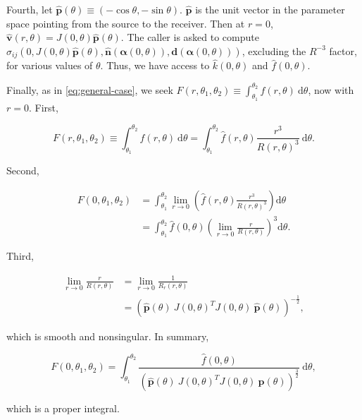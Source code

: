 \documentclass[11pt]{article}
\renewcommand{\vec}[1]{\boldsymbol{#1}}
\newcommand{\uvec}[1]{\hat{\boldsymbol{#1}}}
\begin{document}
Fourth, let $\uvec{p}(\theta) \equiv (-\cos \theta, -\sin \theta)$.
$\uvec{p}$ is the unit vector in the parameter space pointing from the source to the receiver.
Then at $r=0$, $\uvec{v}(r,\theta) = J(0,\theta) \uvec{p}(\theta)$.
The caller is asked to compute
$\sigma_{ij}(0, J(0,\theta) \uvec{p}(\theta), \uvec{n}(\vec{\alpha}(0,\theta)), \vec{d}(\vec{\alpha}(0,\theta)))$,
excluding the $R^{-3}$ factor, for various values of $\theta$.
Thus, we have access to $\hat{k}(0,\theta)$ and $\hat{f}(0,\theta)$.

Finally, as in \eqref{eq:general-case},
we seek $F(r,\theta_1,\theta_2) \equiv \int_{\theta_1}^{\theta_2} f(r,\theta) \ \mathrm{d} \theta$,
now with $r=0$.
First,
\begin{linenomath}\begin{equation*}
  F(r,\theta_1,\theta_2) \equiv \int_{\theta_1}^{\theta_2} f(r,\theta) \ \mathrm{d} \theta
  = \int_{\theta_1}^{\theta_2} \hat{f}(r,\theta) \frac{r^3}{R(r,\theta)^3} \ \mathrm{d} \theta.
\end{equation*}\end{linenomath}
Second,
\begin{linenomath}\begin{align*}
  F(0,\theta_1,\theta_2)
  &= \int_{\theta_1}^{\theta_2} \lim_{r \rightarrow 0} \left( \hat{f}(r,\theta) \frac{r^3}{R(r,\theta)^3} \right) \mathrm{d} \theta \\
  &= \int_{\theta_1}^{\theta_2} \hat{f}(0,\theta) \left( \lim_{r \rightarrow 0} \frac{r}{R(r,\theta)} \right)^3 \mathrm{d} \theta.
\end{align*}\end{linenomath}
Third,
\begin{linenomath}\begin{align*}
  \lim_{r \rightarrow 0} \frac{r}{R(r,\theta)}
  &= \lim_{r \rightarrow 0} \frac{1}{R_r(r,\theta)} \\
  &= \left( \uvec{p}(\theta) \ J(0,\theta)^T J(0,\theta) \ \uvec{p}(\theta) \right)^{-\frac{1}{2}},
\end{align*}\end{linenomath}
which is smooth and nonsingular.
In summary,
\begin{linenomath}\begin{equation*}
  F(0,\theta_1,\theta_2)
  = \int_{\theta_1}^{\theta_2} \frac{\hat{f}(0,\theta)}{(\uvec{p}(\theta) \ J(0,\theta)^T J(0,\theta) \ \uvec{p}(\theta))^\frac{3}{2}} \ \mathrm{d} \theta,
\end{equation*}\end{linenomath}
which is a proper integral.



\end{document}
